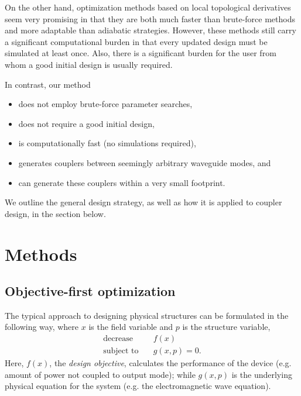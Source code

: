 \documentclass[letterpaper,10pt]{article}
\begin{document}
On the other hand, optimization methods based on local topological derivatives 
    seem very promising\cite{deriv}
    in that they are both much faster than brute-force methods and
    more adaptable than adiabatic strategies.
However, these methods still carry a significant computational burden 
    in that every updated design must be simulated at least once.
Also, there is a significant burden for the user from whom
    a good initial design is usually required.


In contrast, our method
\begin{itemize}
    \item does not employ brute-force parameter searches,
    \item does not require a good initial design,
    \item is computationally fast (no simulations required),
    \item generates couplers between seemingly arbitrary waveguide modes, and
    \item can generate these couplers within a very small footprint. 
\end{itemize}
We outline the general design strategy,
    as well as how it is applied to coupler design, in the section below.

\section{Methods}
\subsection{Objective-first optimization}
The typical approach to designing physical structures can be formulated 
    in the following way, 
    where $x$ is the field variable and $p$ is the structure variable,
    \begin{subequations}\label{eq:adj}
    \begin{align} 
    \text{decrease} & \quad f(x) \label{eq:adj:obj} \\ 
    \text{subject to} & \quad g(x,p) = 0. \label{eq:adj:con}
    \end{align}
    \end{subequations}
Here, $f(x)$, the \emph{design objective}, 
    calculates the performance of the device 
    (e.g. amount of power not coupled to output mode); 
    while $g(x,p)$ is the underlying physical equation for the system
    (e.g. the electromagnetic wave equation).
\end{document}
